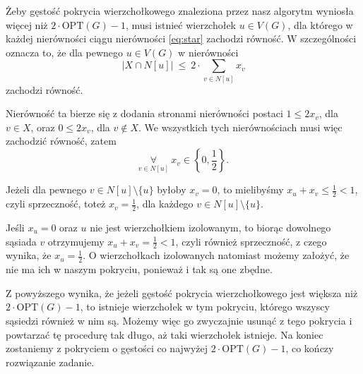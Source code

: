 \documentclass[12pt]{article}
\begin{document}
	\medskip
	
	Żeby gęstość pokrycia wierzchołkowego znaleziona przez nasz algorytm
	wyniosła więcej niż \(2 \cdot \text{OPT}(G) - 1\), musi istnieć wierzchołek
	\(u \in V(G)\), dla którego w każdej nierówności ciągu nierówności
	\ref{eq:star} zachodzi równość. W szczególności oznacza to, że dla pewnego
	\(u \in V(G)\) w nierówności
	\[ |X \cap N[u]| \ \leqslant \ 2 \cdot \sum\limits_{v \in N[u]} x_{v} \]
	zachodzi równość.
	
	\medskip
	
	Nierówność ta bierze się z dodania stronami nierówności postaci \(1
	\leqslant 2 x_{v}\), dla \(v \in X\), oraz \(0 \leqslant 2x_{v}\), dla
	\(v \notin X\). We wszystkich tych nierównościach musi więc zachodzić
	równość, zatem
	\[ \underset{v \in N[u]}{\forall} \ x_{v} \in \left\{ 0, \frac{1}{2}
	\right\} \text{.} \]
	
	\medskip
	
	Jeżeli dla pewnego \(v \in N[u] \setminus \{u\}\) byłoby \(x_{v} = 0\), to
	mielibyśmy \(x_{u} + x_{v} \leqslant \frac{1}{2} < 1\), czyli sprzeczność,
	toteż \(x_{v} = \frac{1}{2}\), dla każdego \(v \in N[u] \setminus \{u\}\).
	
	\medskip
	
	Jeśli \(x_{u} = 0\) oraz \(u\) nie jest wierzchołkiem izolowanym, to biorąc
	dowolnego sąsiada \(v\) otrzymujemy \(x_{u} + x_{v} = \frac{1}{2} < 1\),
	czyli również sprzeczność, z czego wynika, że \(x_{u} = \frac{1}{2}\). O
	wierzchołkach izolowanych natomiast możemy założyć, że nie ma ich w naszym
	pokryciu, ponieważ i tak są one zbędne.
	
	\medskip
	
	Z powyższego wynika, że jeżeli gęstość pokrycia wierzchołkowego jest większa
	niż \(2 \cdot \text{OPT}(G) - 1\), to istnieje wierzchołek w tym pokryciu,
	którego wszyscy sąsiedzi również w nim są. Możemy więc go zwyczajnie usunąć
	z tego pokrycia i powtarzać tę procedurę tak długo, aż taki wierzchołek
	istnieje. Na koniec zostaniemy z pokryciem o gęstości co najwyżej \(2 \cdot
	\text{OPT}(G) - 1\), co kończy rozwiązanie zadanie.
\end{document}
